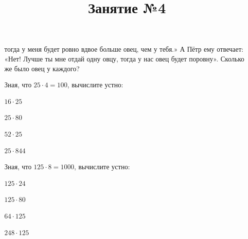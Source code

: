 \begin{listofex}
	тогда у меня будет ровно вдвое больше овец, чем у тебя.» А Пётр ему отвечает: «Нет!
	Лучше ты мне отдай одну овцу, тогда у нас овец будет поровну». Сколько же было овец у
	каждого?
	\item Зная, что \( 25\cdot4=100 \), вычислите устно:
	\begin{enumcols}[itemcolumns=4]
		\item \( 16\cdot25 \)
		\item \( 25\cdot80 \)
		\item \( 52\cdot25 \)
		\item \( 25\cdot844 \)
	\end{enumcols}
	\item Зная, что \( 125\cdot8=1000 \), вычислите устно:
	\begin{enumcols}[itemcolumns=4]
		\item \( 125\cdot24 \)
		\item \( 125\cdot80 \)
		\item \( 64\cdot125 \)
		\item \( 248\cdot125 \)
	\end{enumcols}
\end{listofex}
\newpage
\title{Занятие №4}
